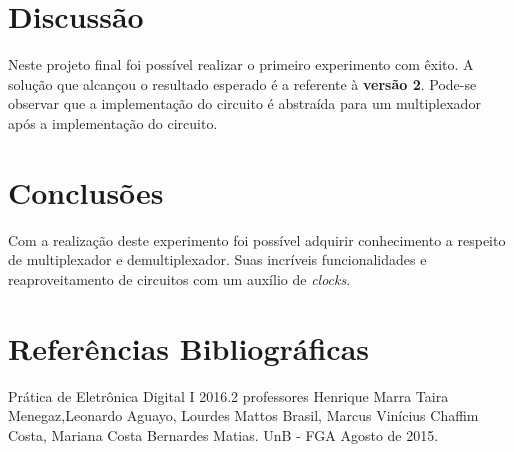 \documentclass[12pts]{article}
\begin{document}
\section{Discussão}
\iffalse
Discussão sobre os resultados encontrados, comentando detalhadamente as medições realizadas e dando a devida interpretação destas, informando se os objetivos da experimento foram alcançados. Esta é uma das partes mais importantes do relatório: aqui, há oportunidade para expressar os conhecimentos adquiridos na prática e fazer a interrelação com os fundamentos teóricos.
\fi

        Neste projeto final foi possível realizar o primeiro experimento com êxito.         
        A solução que alcançou o resultado esperado é a referente à \textbf{versão 2}. Pode-se observar que a implementação do circuito é abstraída para um multiplexador após a implementação do circuito.

\section{Conclusões}
\iffalse
Conclusões, mostrando os êxitos e eventuais problemas encontrados na realização do experimento, indicando as limitações, apresentando recomendações e/ou sugestões.
\fi

Com a realização deste experimento foi possível adquirir conhecimento a respeito de multiplexador e demultiplexador. Suas incríveis funcionalidades e reaproveitamento de circuitos com um auxílio de \textit{clocks}.

\section{Referências Bibliográficas}
\iffalse
Referencias Bibliográficas, relacionadas e citadas de acordo com as normas da ABNT.
\fi
Prática de Eletrônica Digital I 2016.2 professores Henrique Marra Taira Menegaz,Leonardo Aguayo, Lourdes Mattos Brasil, Marcus Vinícius Chaffim Costa, Mariana Costa Bernardes Matias. UnB - FGA Agosto de 2015.

\iffalse
\section{Diagramas Esquemáticos}
Diagramas Esquemáticos. Todos os diagramas devem ser inseridos ao final do relatório em páginas separadas do texto, indicando a identificação do circuito, autor, revisor, versão e datas relevantes.
\fi
\newpage
\end{document}
